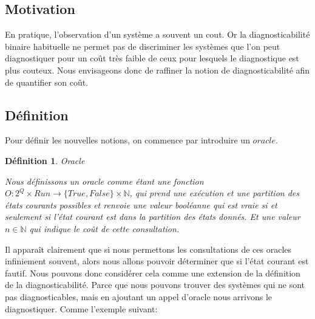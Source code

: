 \documentclass[a4paper,10pt]{article}
\newtheorem{mydef}{D\'efinition}
\begin{document}
\subsection{Motivation}

En pratique, l'observation d'un système a souvent un cout. Or la diagnosticabilité binaire habituelle ne permet pas de discriminer les systèmes que l'on peut diagnostiquer pour un coût très faible de ceux pour lesquels le diagnostique est plus couteux. Nous envisageons donc de raffiner la notion de diagnosticabilit\'e afin de quantifier son coût.

\subsection{D\'efinition}

Pour d\'efinir les nouvelles notions, on commence par introduire un $oracle$.

\begin{mydef}{Oracle}

  Nous d\'efinissons un oracle comme \'etant une fonction $O: 2^Q\times Run \to \{True, False\} \times \mathbb{N}$, qui prend une ex\'ecution et une partition des \'etats courants possibles et renvoie une valeur bool\'eanne qui est vraie si et seulement si l'\'etat courant est dans la partition des \'etats donn\'es. Et une valeur $n \in \mathbb{N}$ qui indique le co\^ut de cette consultation.

\end{mydef}

Il apparaît clairement que si nous permettons les consultations de ces %
 oracles infiniement souvent, alors nous allons pouvoir d\'eterminer que si l'\'etat courant est fautif. Nous pouvons donc consid\'erer cela comme une extension de la d\'efinition de la diagnosticabilit\'e. Parce que nous pouvons trouver des syst\`emes qui ne sont pas diagnosticables, mais en ajoutant un appel d'oracle nous arrivons le diagnostiquer. Comme l'exemple suivant:

\begin{figure}[H]
  \begin{center}
  \end{center}
\end{figure}
\end{document}
